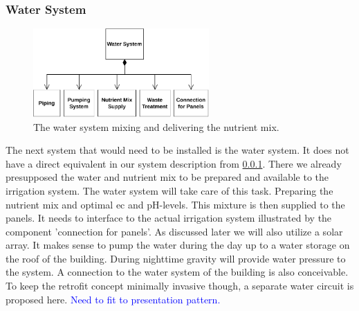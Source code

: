\subsubsection{Water System}
\begin{figure}
	\caption{The water system mixing and delivering the nutrient mix.}
	\label{wfig:water}
	\includegraphics[width=0.6\textwidth]{img/architecture/water.pdf}
\end{figure} 
The next system that would need to be installed is the water system.
It does not have a direct equivalent in our system description from \ref{}.
There we already presupposed the water and nutrient mix to be prepared and available to the irrigation system.
The water system will take care of this task.
Preparing the nutrient mix and optimal \ac{ec} and pH-levels.
This mixture is then supplied to the panels.
It needs to interface to the actual irrigation system illustrated by the component 'connection for panels'.
As discussed later we will also utilize a solar array.
It makes sense to pump the water during the day up to a water storage on the roof of the building.
During nighttime gravity will provide water pressure to the system.
A connection to the water system of the building is also conceivable.
To keep the retrofit concept minimally invasive though, a separate water circuit is proposed here.
\textcolor{Blue}{Need to fit to presentation pattern.}

